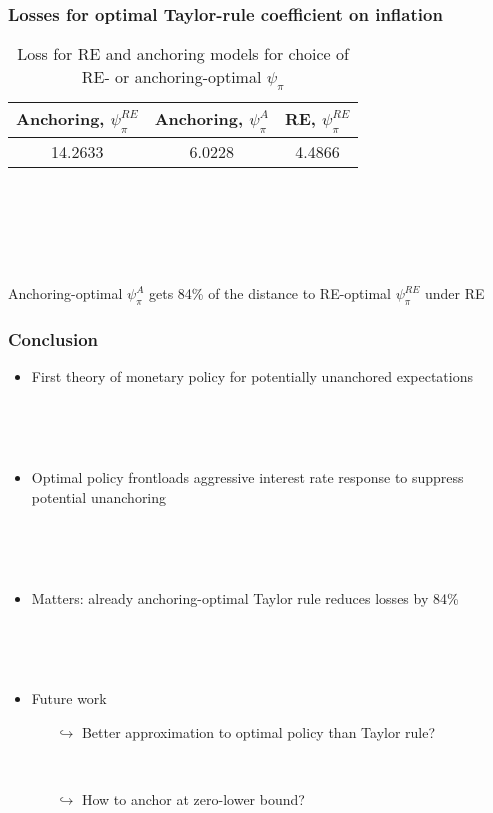 \documentclass[10pt]{beamer}
\def\movei{5 }
\begin{document}
\begin{frame}
	\frametitle{Losses for optimal Taylor-rule coefficient on inflation}
	
\begin{center}
\begin{table}[h!]
      \caption{Loss for RE and anchoring models for choice of RE- or anchoring-optimal $\psi_{\pi}$}  

\begin{tabular}{ c | c | c }
Anchoring, $\psi_{\pi}^{RE}$ & Anchoring, $\psi_{\pi}^{A}$ & RE, $\psi_{\pi}^{RE}$  \\  \hline
 14.2633  &  6.0228 & 4.4866  \\  \hline
\end{tabular}     
      \label{table_welfare}
 \end{table}
\end{center}

\

\


\

\pause

Anchoring-optimal $\psi_{\pi}^A$ gets 84\% of the distance to RE-optimal $\psi_{\pi}^{RE}$ under RE


\end{frame}

\begin{frame}
	\frametitle{Conclusion}

\vspace{0.5cm}
	
\begin{itemize}
\item First theory of monetary policy for potentially unanchored expectations 

\

\


\item Optimal policy frontloads aggressive interest rate response to suppress potential unanchoring

\

\

\item Matters: already anchoring-optimal Taylor rule reduces losses by 84\%

\

\

\item Future work
\begin{itemize}
\item[$\hookrightarrow$] Better approximation to optimal policy than Taylor rule?

\

\item[$\hookrightarrow$]  How to anchor at zero-lower bound?
\end{itemize}


\end{itemize}


\end{frame}
\end{document}
